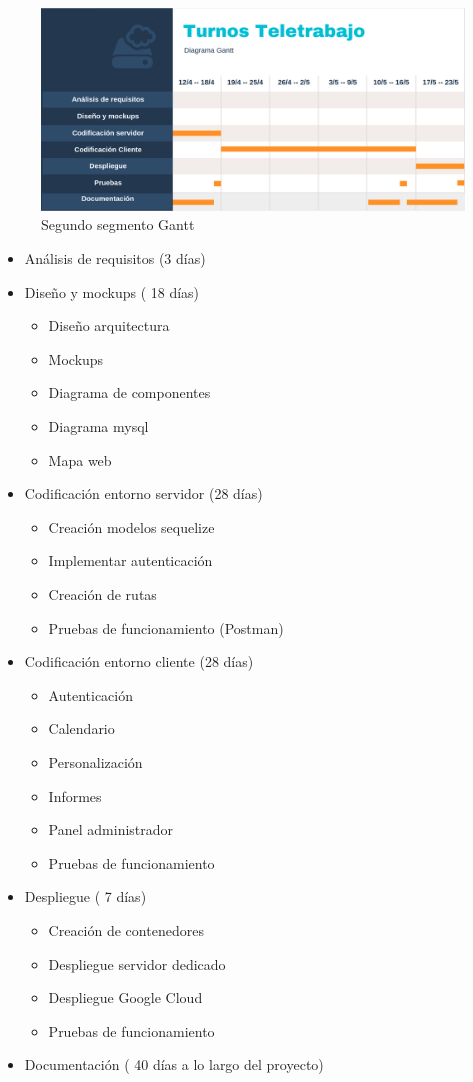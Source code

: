\documentclass[11pt,spanish,listoffigures,listoftables]{tfgetsinf}
\begin{document}
 \begin{figure}[h!] %
   \includegraphics[width=\linewidth]{img/gantt2.png}
   \caption{Segundo segmento Gantt}
   \label{fig:Gantt21}
 \end{figure}
 \pagebreak
\begin{itemize}
   \item Análisis de requisitos  (3 días)  
   \item Diseño y mockups ( 18 días)
   \begin{itemize}
      \item Diseño arquitectura
      \item Mockups
      \item Diagrama de componentes
      \item Diagrama mysql
      \item Mapa web
   \end{itemize}
   \item Codificación entorno servidor (28 días)
   \begin{itemize}
      \item Creación modelos sequelize
      \item Implementar autenticación
      \item Creación de rutas
      \item Pruebas de funcionamiento (Postman)
   \end{itemize}
   \item Codificación entorno cliente (28 días)
   \begin{itemize}
      \item Autenticación
      \item Calendario
      \item Personalización
      \item Informes
      \item Panel administrador
      \item Pruebas de funcionamiento
   \end{itemize}
   \item Despliegue ( 7 días)
   \begin{itemize}
      \item Creación de contenedores
      \item Despliegue servidor dedicado
      \item Despliegue Google Cloud
      \item Pruebas de funcionamiento
   \end{itemize}
   \item Documentación ( 40 días a lo largo del proyecto)
\end{itemize}
\end{document}
